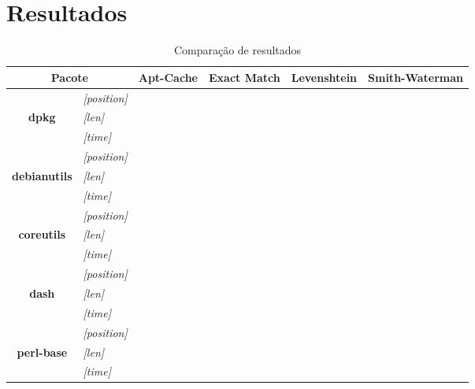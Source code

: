 \chapter{Resultados} %
\label{cha:resultados}

\begin{table}[htbp]
\caption{Comparação de resultados}
\begin{tabular}{|c|l|c|c|c|p{2cm}|}
\hline
\multicolumn{ 2}{|c|}{\textbf{Pacote}} & \textbf{Apt-Cache} & \textbf{Exact Match} & \textbf{Levenshtein} & \textbf{Smith-Waterman} \\ \hline\hline
\multicolumn{ 1}{|c|}{} & \textit{[position]} &  &  &  &  \\ \cline{ 2- 6}
\multicolumn{ 1}{|c|}{\textbf{dpkg}} & \textit{[len]} &  &  &  &  \\ \cline{ 2- 6}
\multicolumn{ 1}{|c|}{} & \textit{[time]} &  &  &  &  \\ \hline
\multicolumn{ 1}{|c|}{} & \textit{[position]} &  &  &  &  \\ \cline{ 2- 6}
\multicolumn{ 1}{|c|}{\textbf{debianutils}} & \textit{[len]} &  &  &  &  \\ \cline{ 2- 6}
\multicolumn{ 1}{|c|}{} & \textit{[time]} &  &  &  &  \\ \hline
\multicolumn{ 1}{|c|}{} & \textit{[position]} &  &  &  &  \\ \cline{ 2- 6}
\multicolumn{ 1}{|c|}{\textbf{coreutils}} & \textit{[len]} &  &  &  &  \\ \cline{ 2- 6}
\multicolumn{ 1}{|c|}{} & \textit{[time]} &  &  &  &  \\ \hline
\multicolumn{ 1}{|c|}{} & \textit{[position]} &  &  &  &  \\ \cline{ 2- 6}
\multicolumn{ 1}{|c|}{\textbf{dash}} & \textit{[len]} &  &  &  &  \\ \cline{ 2- 6}
\multicolumn{ 1}{|c|}{} & \textit{[time]} &  &  &  &  \\ \hline
\multicolumn{ 1}{|c|}{} & \textit{[position]} &  &  &  &  \\ \cline{ 2- 6}
\multicolumn{ 1}{|c|}{\textbf{perl-base}} & \textit{[len]} &  &  &  &  \\ \cline{ 2- 6}
\multicolumn{ 1}{|c|}{} & \textit{[time]} &  &  &  &  \\ \hline
\end{tabular}
\label{tab:comparacao}
\end{table}

\lipsum[1]